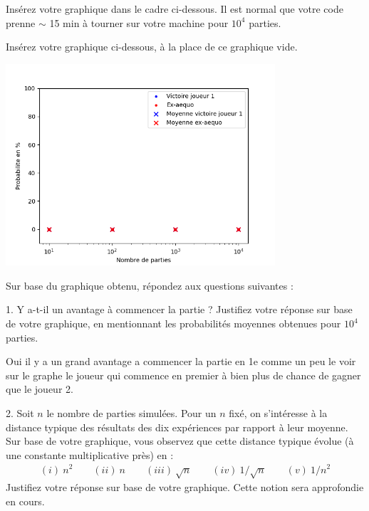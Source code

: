 \documentclass[11pt,answers]{exam}
\begin{document}
Insérez votre graphique dans le cadre ci-dessous. Il est normal que votre code prenne $\sim$ 15 min à tourner sur votre machine pour $10^4$ parties.

\begin{solutionbox}{100mm}
    Insérez votre graphique ci-dessous, à la place de ce graphique vide.

    \centering
    \includegraphics[width=0.75\textwidth]{MCplot_empty.png}
\end{solutionbox}

Sur base du graphique obtenu, répondez aux questions suivantes :

\medskip

1. Y a-t-il un avantage à commencer la partie ? Justifiez votre réponse sur base de votre graphique, en mentionnant les probabilités moyennes obtenues pour $10^4$ parties.
    
\begin{solutionbox}{25mm}
Oui il y a un grand avantage a commencer la partie en 1e comme un peu le voir sur le graphe le joueur qui commence en premier à bien plus de chance de gagner que le joueur 2.

\end{solutionbox}

\medskip

2. Soit $n$ le nombre de parties simulées. Pour un $n$ fixé, on s'intéresse à la distance typique des résultats des dix expériences par rapport à leur moyenne. Sur base de votre graphique, vous observez que cette distance typique évolue (à une constante multiplicative près) en :
\begin{align*}
      (i) \ n^2 \qquad  (ii) \ n \qquad  (iii)\  \sqrt{n} \qquad (iv) \ 1/\sqrt{n} \qquad  (v) \  1/n^2
\end{align*}
Justifiez votre réponse sur base de votre graphique. Cette notion sera approfondie en cours.
\end{document}
